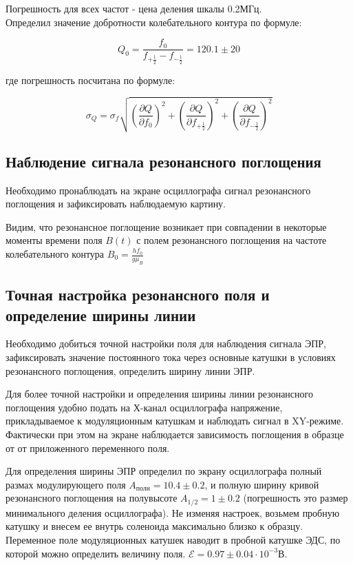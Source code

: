 \documentclass[14pt,a4paper]{scrartcl}
\begin{document}
Погрешность для всех частот - цена деления шкалы 0.2МГц.\\

Определил значение добротности колебательного контура по формуле:

$$
Q_{0}=\frac{f_{0}}{f_{+\frac{1}{2}}-f_{-\frac{1}{2}}} = 120.1 \pm 20
$$

где погрешность посчитана по формуле:

$$
\sigma_{Q}=\sigma_{f} \sqrt{\left(\frac{\partial Q}{\partial f_{0}}\right)^{2}+\left(\frac{\partial Q}{\partial f_{+\frac{1}{2}}}\right)^{2}+\left(\frac{\partial Q}{\partial f_{-\frac{1}{2}}}\right)^{2}}
$$

\subsection{Наблюдение сигнала резонансного поглощения}

Необходимо пронаблюдать на экране осциллографа сигнал резонансного поглощения и зафиксировать наблюдаемую картину.

Видим, что резонансное поглощение возникает при совпадении в некоторые моменты времени поля $B(t)$ с полем резонансного поглощения на частоте колебательного контура $B_0 = \frac{hf_0}{g\mu_B}$



\subsection{Точная настройка резонансного поля и определение ширины линии}

Необходимо добиться точной настройки поля для наблюдения сигнала ЭПР, зафиксировать значение постоянного тока через основные катушки в условиях резонансного поглощения, определить ширину линии ЭПР.

Для более точной настройки и определения ширины линии резонансного поглощения удобно подать на Х-канал осциллографа напряжение, прикладываемое к модуляционным катушкам и наблюдать сигнал в XY-режиме. Фактически при этом на экране наблюдается зависимость поглощения в образце от от приложенного переменного поля.

Для определения ширины ЭПР определил по экрану осциллографа полный размах модулирующего поля $A_{\text{полн}} = 10.4 \pm 0.2$, и полную ширину кривой резонансного поглощения на полувысоте $A_{1/2} = 1 \pm 0.2$ (погрешность это размер минимального деления осциллографа). Не изменяя настроек, возьмем пробную катушку и внесем ее внутрь соленоида максимально близко к образцу. Переменное поле модуляционных катушек наводит в пробной катушке ЭДС, по которой можно определить величину поля. $\mathcal{E} = 0.97 \pm 0.04 \cdot 10^{-3}$В.
\end{document}
